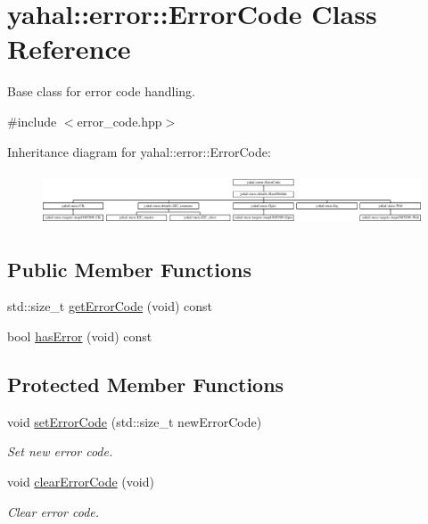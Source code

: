 \hypertarget{classyahal_1_1error_1_1_error_code}{}\section{yahal\+:\+:error\+:\+:Error\+Code Class Reference}
\label{classyahal_1_1error_1_1_error_code}


Base class for error code handling.  




{\ttfamily \#include $<$error\+\_\+code.\+hpp$>$}

Inheritance diagram for yahal\+:\+:error\+:\+:Error\+Code\+:\begin{figure}[H]
\begin{center}
\leavevmode
\includegraphics[height=1.575246cm]{classyahal_1_1error_1_1_error_code}
\end{center}
\end{figure}
\subsection*{Public Member Functions}
\begin{DoxyCompactItemize}
\item 
std\+::size\+\_\+t \hyperlink{classyahal_1_1error_1_1_error_code_ab6cafddc35cacf01a434862696780259}{get\+Error\+Code} (void) const 
\item 
bool \hyperlink{classyahal_1_1error_1_1_error_code_a2c92ad4dd5a16cd0f994fb14d35f2245}{has\+Error} (void) const 
\end{DoxyCompactItemize}
\subsection*{Protected Member Functions}
\begin{DoxyCompactItemize}
\item 
void \hyperlink{classyahal_1_1error_1_1_error_code_a2709825a2c104d8fbb74467580ecf0bc}{set\+Error\+Code} (std\+::size\+\_\+t new\+Error\+Code)
\begin{DoxyCompactList}\small\item\em Set new error code. \end{DoxyCompactList}\item 
void \hyperlink{classyahal_1_1error_1_1_error_code_a6dcccae993641509661b2f92c702b714}{clear\+Error\+Code} (void)
\begin{DoxyCompactList}\small\item\em Clear error code. \end{DoxyCompactList}\end{DoxyCompactItemize}
